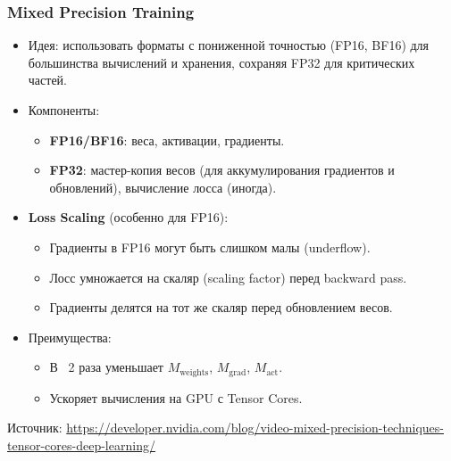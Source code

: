 \begin{frame}
  \frametitle{Mixed Precision Training}
  \begin{itemize}
    \item Идея: использовать форматы с пониженной точностью (FP16, BF16) для большинства вычислений и хранения, сохраняя FP32 для критических частей.
    \item Компоненты:
      \begin{itemize}
        \item \textbf{FP16/BF16}: веса, активации, градиенты.
        \item \textbf{FP32}: мастер-копия весов (для аккумулирования градиентов и обновлений), вычисление лосса (иногда).
      \end{itemize}
    \item \textbf{Loss Scaling} (особенно для FP16):
      \begin{itemize}
        \item Градиенты в FP16 могут быть слишком малы (underflow).
        \item Лосс умножается на скаляр (scaling factor) перед backward pass.
        \item Градиенты делятся на тот же скаляр перед обновлением весов.
      \end{itemize}
    \item Преимущества:
      \begin{itemize}
        \item В ~2 раза уменьшает $M_{\text{weights}}$, $M_{\text{grad}}$, $M_{\text{act}}$.
        \item Ускоряет вычисления на GPU с Tensor Cores.
      \end{itemize}
  \end{itemize}
  \vspace{0.5cm}
  \begin{flushright}
    \tiny Источник: \url{https://developer.nvidia.com/blog/video-mixed-precision-techniques-tensor-cores-deep-learning/}
  \end{flushright}
\end{frame}

